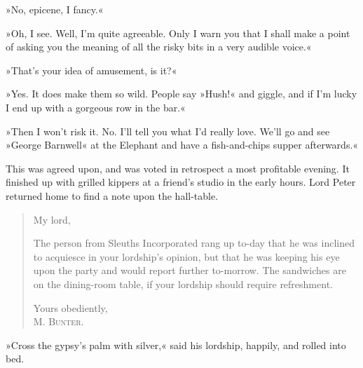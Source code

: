 »No, epicene, I fancy.«

»Oh, I see. Well, I'm quite agreeable. Only I warn you that I shall make a point of asking you the meaning of all the risky bits in a very audible voice.«

»That's your idea of amusement, is it?«

»Yes. It does make them so wild. People say »Hush!« and giggle, and if I'm lucky I end up with a gorgeous row in the bar.«

»Then I won't risk it. No. I'll tell you what I'd really love. We'll go and see »George Barnwell« at the Elephant and have a fish-and-chips supper afterwards.«

This was agreed upon, and was voted in retrospect a most profitable evening. It finished up with grilled kippers at a friend's studio in the early hours. Lord Peter returned home to find a note upon the hall-table.

\begin{quote}
\noindent My lord,

The person from Sleuths Incorporated rang up to-day that he was inclined to acquiesce in your lordship's opinion, but that he was keeping his eye upon the party and would report further to-morrow. The sandwiches are on the dining-room table, if your lordship should require refreshment.

\begin{flushright}
Yours obediently,\\
\textsc{M. Bunter.}
\end{flushright}
\end{quote}

»Cross the gypsy's palm with silver,« said his lordship, happily, and rolled into bed.
